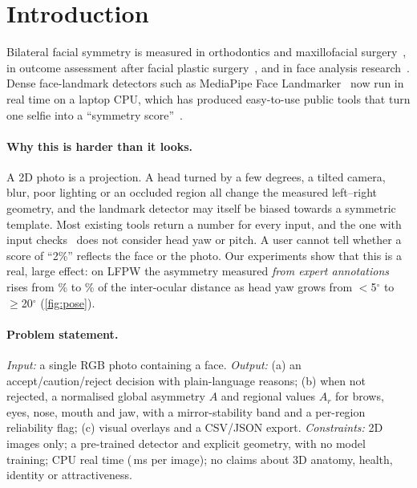\section{Introduction}
\label{sec:intro}

Bilateral facial symmetry is measured in orthodontics and maxillofacial
surgery~\cite{berlin2014asymmetry2d}, in outcome assessment after facial plastic
surgery~\cite{varghaei2025aesthetic}, and in face analysis research~\cite{liu2003asymmetry}.
Dense face-landmark detectors such as MediaPipe Face
Landmarker~\cite{kartynnik2019facemesh,mediapipe_facelandmarker} now run in real time on a
laptop CPU, which has produced easy-to-use public tools that turn one selfie into a
``symmetry score''~\cite{nashokan_facialasymmetry,yousrajnahi_symmetry,irimid}.

\paragraph{Why this is harder than it looks.}
A 2D photo is a projection. A head turned by a few degrees, a tilted camera, blur, poor
lighting or an occluded region all change the measured left--right geometry, and the
landmark detector may itself be biased towards a symmetric template. Most existing tools
return a number for every input, and the one with input checks~\cite{irimid} does not
consider head yaw or pitch. A user cannot tell whether a score of ``2\%'' reflects the
face or the photo. Our experiments show that this is a real, large effect: on LFPW the
asymmetry measured \emph{from expert annotations} rises from \yawLow\% to \yawHigh\% of the
inter-ocular distance as head yaw grows from $<$5$^\circ$ to $\geq$20$^\circ$
(\cref{fig:pose}).

\paragraph{Problem statement.}
\emph{Input:} a single RGB photo containing a face.
\emph{Output:} (a) an accept/caution/reject decision with plain-language reasons;
(b) when not rejected, a normalised global asymmetry $A$ and regional values $A_r$ for
brows, eyes, nose, mouth and jaw, with a mirror-stability band and a per-region
reliability flag; (c) visual overlays and a CSV/JSON export.
\emph{Constraints:} 2D images only; a pre-trained detector and explicit geometry, with no
model training; CPU real time (\runtime\,ms per image); no claims about 3D anatomy,
health, identity or attractiveness.

